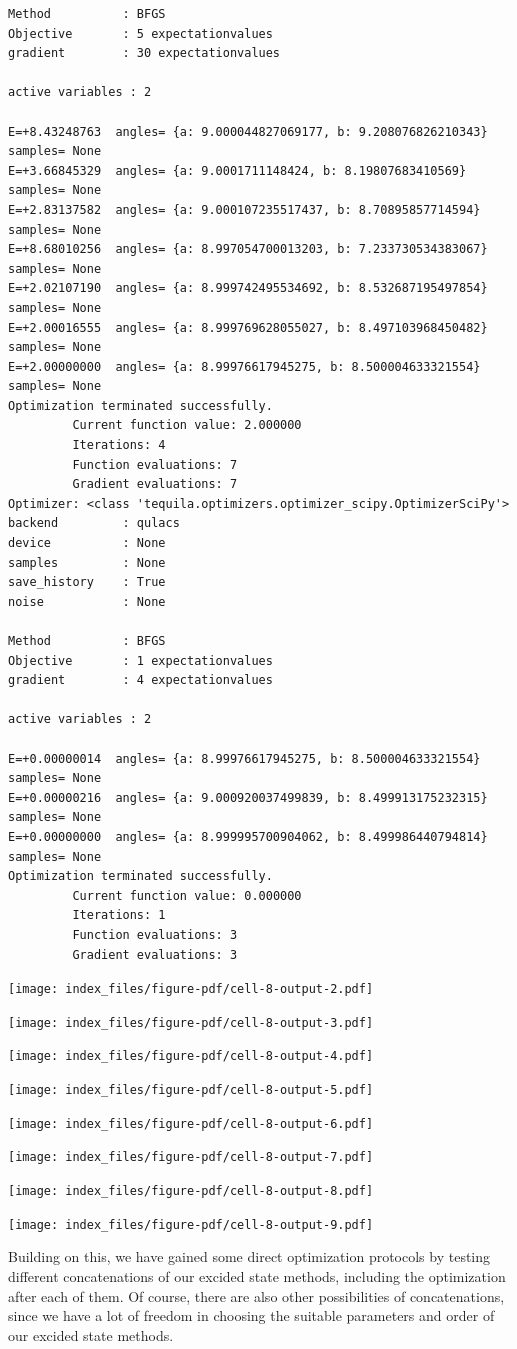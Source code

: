 \documentclass[
  letterpaper,
  DIV=11,
  numbers=noendperiod]{scrartcl}
\begin{document}
\begin{verbatim}
Method          : BFGS
Objective       : 5 expectationvalues
gradient        : 30 expectationvalues

active variables : 2

E=+8.43248763  angles= {a: 9.000044827069177, b: 9.208076826210343}  samples= None
E=+3.66845329  angles= {a: 9.0001711148424, b: 8.19807683410569}  samples= None
E=+2.83137582  angles= {a: 9.000107235517437, b: 8.70895857714594}  samples= None
E=+8.68010256  angles= {a: 8.997054700013203, b: 7.233730534383067}  samples= None
E=+2.02107190  angles= {a: 8.999742495534692, b: 8.532687195497854}  samples= None
E=+2.00016555  angles= {a: 8.999769628055027, b: 8.497103968450482}  samples= None
E=+2.00000000  angles= {a: 8.99976617945275, b: 8.500004633321554}  samples= None
Optimization terminated successfully.
         Current function value: 2.000000
         Iterations: 4
         Function evaluations: 7
         Gradient evaluations: 7
Optimizer: <class 'tequila.optimizers.optimizer_scipy.OptimizerSciPy'> 
backend         : qulacs
device          : None
samples         : None
save_history    : True
noise           : None

Method          : BFGS
Objective       : 1 expectationvalues
gradient        : 4 expectationvalues

active variables : 2

E=+0.00000014  angles= {a: 8.99976617945275, b: 8.500004633321554}  samples= None
E=+0.00000216  angles= {a: 9.000920037499839, b: 8.499913175232315}  samples= None
E=+0.00000000  angles= {a: 8.999995700904062, b: 8.499986440794814}  samples= None
Optimization terminated successfully.
         Current function value: 0.000000
         Iterations: 1
         Function evaluations: 3
         Gradient evaluations: 3
\end{verbatim}

\texttt{[image: index\_files/figure-pdf/cell-8-output-2.pdf]}

\texttt{[image: index\_files/figure-pdf/cell-8-output-3.pdf]}

\texttt{[image: index\_files/figure-pdf/cell-8-output-4.pdf]}

\texttt{[image: index\_files/figure-pdf/cell-8-output-5.pdf]}

\texttt{[image: index\_files/figure-pdf/cell-8-output-6.pdf]}

\texttt{[image: index\_files/figure-pdf/cell-8-output-7.pdf]}

\texttt{[image: index\_files/figure-pdf/cell-8-output-8.pdf]}

\texttt{[image: index\_files/figure-pdf/cell-8-output-9.pdf]}

Building on this, we have gained some direct optimization protocols by
testing different concatenations of our excided state methods, including
the optimization after each of them. Of course, there are also other
possibilities of concatenations, since we have a lot of freedom in
choosing the suitable parameters and order of our excided state methods.


\printbibliography
\end{document}
